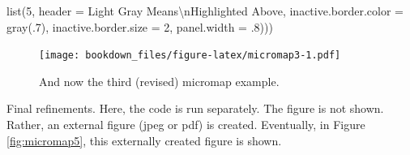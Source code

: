 \documentclass[
]{krantz}
\makeatletter
\newenvironment{Shaded}{\begin{snugshade}}{\end{snugshade}}
\newcommand{\AttributeTok}[1]{\textcolor[rgb]{0.61,0.61,0.61}{#1}}
\newcommand{\DecValTok}[1]{\textcolor[rgb]{0.06,0.06,0.06}{#1}}
\newcommand{\FunctionTok}[1]{\textcolor[rgb]{0,0,0}{#1}}
\newcommand{\NormalTok}[1]{#1}
\newcommand{\SpecialCharTok}[1]{\textcolor[rgb]{0,0,0}{#1}}
\newcommand{\StringTok}[1]{\textcolor[rgb]{0.5,0.5,0.5}{#1}}
\newenvironment{kframe}{%
\medskip{}
\setlength{\fboxsep}{.8em}
 \def\at@end@of@kframe{}%
 \ifinner\ifhmode%
  \def\at@end@of@kframe{\end{minipage}}%
  \begin{minipage}{\columnwidth}%
 \fi\fi%
 \def\FrameCommand##1{\hskip\@totalleftmargin \hskip-\fboxsep
 \colorbox{shadecolor}{##1}\hskip-\fboxsep
     \hskip-\linewidth \hskip-\@totalleftmargin \hskip\columnwidth}%
 \MakeFramed {\advance\hsize-\width
   \@totalleftmargin\z@ \linewidth\hsize
   \@setminipage}}%
 {\par\unskip\endMakeFramed%
 \at@end@of@kframe}
\renewenvironment{Shaded}{\begin{kframe}}{\end{kframe}}
\makeatother
\begin{document}
\begin{Shaded}
\begin{Highlighting}[]
                \FunctionTok{list}\NormalTok{(}\DecValTok{5}\NormalTok{, }\AttributeTok{header =} \StringTok{\textquotesingle{}Light Gray Means}\SpecialCharTok{\textbackslash{}n}\StringTok{Highlighted Above\textquotesingle{}}\NormalTok{, }
                    \AttributeTok{inactive.border.color =} \FunctionTok{gray}\NormalTok{(.}\DecValTok{7}\NormalTok{), }\AttributeTok{inactive.border.size =} \DecValTok{2}\NormalTok{, }
                    \AttributeTok{panel.width =}\NormalTok{ .}\DecValTok{8}\NormalTok{)))}
\end{Highlighting}
\end{Shaded}

\begin{figure}
\centering
\texttt{[image: bookdown\_files/figure-latex/micromap3-1.pdf]}
\caption{\label{fig:micromap3}And now the third (revised) micromap example.}
\end{figure}

Final refinements. Here, the code is run separately. The figure is not shown.
Rather, an external figure (jpeg or pdf) is created. Eventually,
in Figure \ref{fig:micromap5}, this externally created figure is shown.
\end{document}
